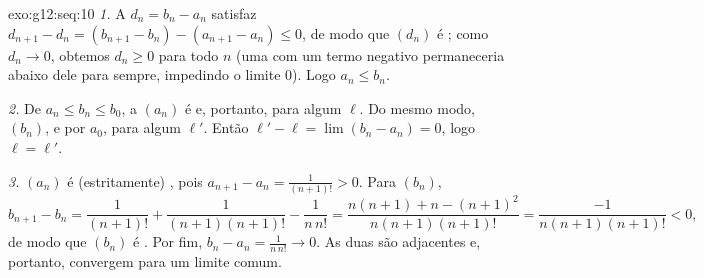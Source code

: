\begin{solution}{exo:g12:seq:10}
\emph{1.} A  $d_n = b_n - a_n$ satisfaz
$d_{n+1} - d_n = (b_{n+1} - b_n) - (a_{n+1} - a_n) \leq 0$, de modo que
$(d_n)$ é ; como $d_n \to 0$, obtemos $d_n \geq 0$ para todo
$n$ (uma   com um termo negativo permaneceria abaixo
dele para sempre, impedindo o limite $0$). Logo $a_n \leq b_n$.

\emph{2.} De $a_n \leq b_n \leq b_0$, a   $(a_n)$ é
 e, portanto,  para algum $\ell$. Do mesmo
modo, $(b_n)$,  e  por $a_0$, 
para algum $\ell'$. Então $\ell' - \ell = \lim (b_n - a_n) = 0$, logo
$\ell = \ell'$.

\emph{3.} $(a_n)$ é (estritamente) , pois
$a_{n+1} - a_n = \frac{1}{(n+1)!} > 0$. Para $(b_n)$,
\[
b_{n+1} - b_n = \frac{1}{(n+1)!} + \frac{1}{(n+1)(n+1)!} - \frac{1}{n\,n!}
= \frac{n(n+1) + n - (n+1)^2}{n(n+1)(n+1)!}
= \frac{-1}{n(n+1)(n+1)!} < 0 ,
\]
de modo que $(b_n)$ é . Por fim,
$b_n - a_n = \frac{1}{n\,n!} \to 0$. As duas  são adjacentes e,
portanto, convergem para um limite comum.
\end{solution}

